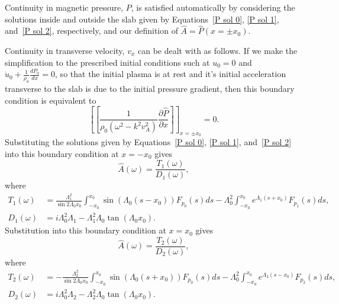 \documentclass{aastex61}
\begin{document}
Continuity in magnetic pressure, $P$, is satisfied automatically by considering the solutions inside and outside the slab given by Equations~\eqref{P sol 0}, \eqref{P sol 1}, and~\eqref{P sol 2}, respectively, and our definition of $\hat{A} = \hat{P}(x=\pm x_0)$.

Continuity in transverse velocity, $v_x$ can be dealt with as follows. If we make the simplification to the prescribed initial conditions such at $u_0 = 0$ and $\dot{u}_0 + \frac{1}{\rho_0}\frac{dP_0}{dx} = 0$, so that the initial plasma is at rest and it's initial acceleration transverse to the slab is due to the initial pressure gradient, then this boundary condition is equivalent to
\begin{equation}
\left[ \left[ \frac{1}{\rho_0(\omega^2 - k^2v_A^2)} \frac{\partial \hat{P}}{\partial x} \right] \right]_{x=\pm x_0} = 0.
\end{equation}
Substituting the solutions given by Equations~\eqref{P sol 0}, \eqref{P sol 1}, and~\eqref{P sol 2} into this boundary condition at $x=-x_0$ gives
\begin{equation}
\hat{A}(\omega) = \frac{T_1(\omega)}{D_1(\omega)},
\end{equation}
where
\begin{align}
T_1(\omega) & = \frac{\Lambda_1^2}{\sin{2\Lambda_0x_0}} \int_{-x_0}^{x_0} \sin(\Lambda_0(s - x_0)) F_{p_0}(s) ds - \Lambda_0^2 \int_{-x_0}^{x_0} e^{\Lambda_1(s+x_0)} F_{p_1}(s) ds, \\
D_1(\omega) & = i\Lambda_0^2\Lambda_1 - \Lambda_1^2\Lambda_0\tan(\Lambda_0x_0).
\end{align}
Substitution into this boundary condition at $x=x_0$ gives
\begin{equation}
\hat{A}(\omega) = \frac{T_2(\omega)}{D_2(\omega)},
\end{equation}
where
\begin{align}
T_2(\omega) & = - \frac{\Lambda_2^2}{\sin{2\Lambda_0x_0}} \int_{-x_0}^{x_0} \sin(\Lambda_0(s + x_0)) F_{p_0}(s) ds - \Lambda_0^2 \int_{-x_0}^{x_0} e^{\Lambda_2(s - x_0)} F_{p_2}(s) ds, \\
D_2(\omega) & = i\Lambda_0^2\Lambda_2 - \Lambda_2^2\Lambda_0\tan(\Lambda_0x_0).
\end{align}


\end{document}
